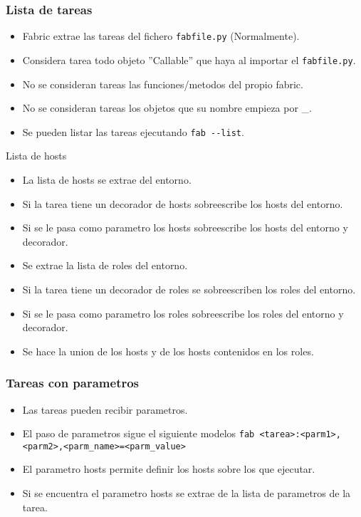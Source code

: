 \documentclass[10pt]{beamer}
\begin{document}
  \begin{frame}[containsverbatim]
    \frametitle{Lista de tareas}
    \begin{itemize}
      \item Fabric extrae las tareas del fichero \verb+fabfile.py+ (Normalmente).
      \item Considera tarea todo objeto ''Callable'' que haya al importar el \verb+fabfile.py+.
      \item No se consideran tareas las funciones/metodos del propio fabric.
      \item No se consideran tareas los objetos que su nombre empieza por \_.
      \item Se pueden listar las tareas ejecutando \verb+fab --list+.
    \end{itemize}
  \end{frame}

  \begin{frame}{Lista de hosts}
    \begin{itemize}
      \item La lista de hosts se extrae del entorno.
      \item Si la tarea tiene un decorador de hosts sobreescribe los hosts del entorno.
      \item Si se le pasa como parametro los hosts sobreescribe los hosts del entorno y decorador.
      \item Se extrae la lista de roles del entorno.
      \item Si la tarea tiene un decorador de roles se sobreescriben los roles del entorno.
      \item Si se le pasa como parametro los roles sobreescribe los roles del entorno y decorador.
      \item Se hace la union de los hosts y de los hosts contenidos en los roles.
    \end{itemize}
  \end{frame}

  \begin{frame}[containsverbatim]
    \frametitle{Tareas con parametros}
    \begin{itemize}
      \item Las tareas pueden recibir parametros.
      \item El paso de parametros sigue el siguiente modelos \verb+fab <tarea>:<parm1>,<parm2>,<parm_name>=<parm_value>+
      \item El parametro hosts permite definir los hosts sobre los que ejecutar.
      \item Si se encuentra el parametro hosts se extrae de la lista de parametros de la tarea.
    \end{itemize}
  \end{frame}
  
\end{document}

